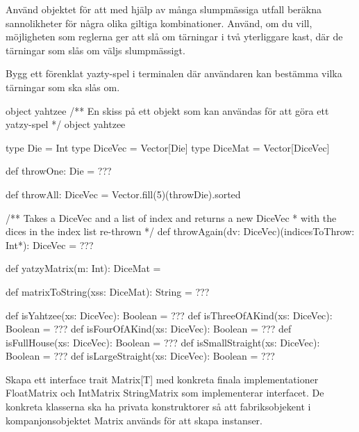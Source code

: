 \Subtask Använd objektet för att med hjälp av många slumpmässiga utfall beräkna sannolikheter för några olika giltiga kombinationer. Använd, om du vill, möjligheten som reglerna ger att slå om tärningar i två yterliggare kast, där de tärningar som slås om väljs slumpmässigt.

\Subtask Bygg ett förenklat yazty-spel i terminalen där användaren kan bestämma vilka tärningar som ska slås om.

\begin{ScalaSpec}{object yahtzee}
/** En skiss på ett objekt som kan användas för att göra ett yatzy-spel */
object yahtzee {
  type Die = Int
  type DiceVec = Vector[Die]
  type DiceMat = Vector[DiceVec]

  def throwOne: Die = ???
  
  def throwAll: DiceVec = Vector.fill(5)(throwDie).sorted

  /** Takes a DiceVec and a list of index and returns a new DiceVec 
    * with the dices in the index list re-thrown */
  def throwAgain(dv: DiceVec)(indicesToThrow: Int*): DiceVec = ???

  def yatzyMatrix(m: Int): DiceMat = 
  
  def matrixToString(xss: DiceMat): String = ???
  
  def isYahtzee(xs: DiceVec): Boolean = ???
  def isThreeOfAKind(xs: DiceVec): Boolean = ???
  def isFourOfAKind(xs: DiceVec): Boolean = ???
  def isFullHouse(xs: DiceVec): Boolean = ???
  def isSmallStraight(xs: DiceVec): Boolean = ???
  def isLargeStraight(xs: DiceVec): Boolean = ???
}
\end{ScalaSpec}


\AdvancedTasks %

\Task Skapa ett interface trait Matrix[T] med konkreta finala implementationer FloatMatrix och IntMatrix StringMatrix som implementerar interfacet. De konkreta klasserna ska ha privata konstruktorer så att fabriksobjekent i kompanjonsobjektet Matrix används för att skapa instanser.
    